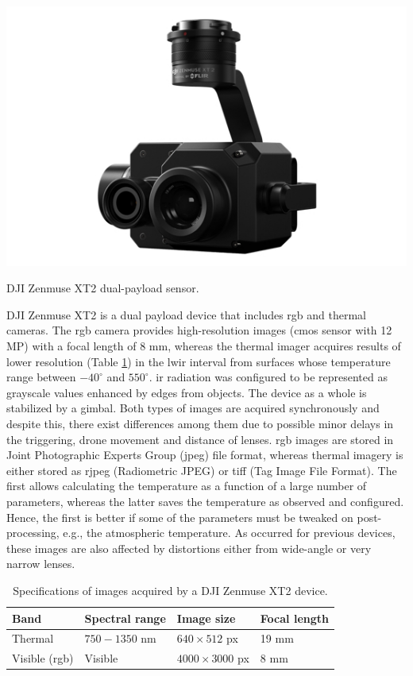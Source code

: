 \begin{marginfigure}[.1cm]
	\includegraphics{figs/materials/zenmuse_xt2.png}
	\caption{DJI Zenmuse XT2 dual-payload sensor.}
	\label{fig:zenmuse_xt2}
\end{marginfigure}
DJI Zenmuse XT2 is a dual payload device that includes \acrshort{rgb} and thermal cameras. The \acrshort{rgb} camera provides high-resolution images (\acrshort{cmos} sensor with 12 MP) with a focal length of 8 \si{\milli\meter}, whereas the thermal imager acquires results of lower resolution (Table \ref{table:zenmuse_xt2}) in the \acrshort{lwir} interval from surfaces whose temperature range between $-40^\circ$ and $550^\circ$. \acrshort{ir} radiation was configured to be represented as grayscale values enhanced by edges from objects. The device as a whole is stabilized by a gimbal. Both types of images are acquired synchronously and despite this, there exist differences among them due to possible minor delays in the triggering, drone movement and distance of lenses. \acrshort{rgb} images are stored in Joint Photographic Experts Group (\acrshort{jpeg}) file format, whereas thermal imagery is either stored as \acrshort{rjpeg} (Radiometric JPEG) or \acrshort{tiff} (Tag Image File Format). The first allows calculating the temperature as a function of a large number of parameters, whereas the latter saves the temperature as observed and configured. Hence, the first is better if some of the parameters must be tweaked on post-processing, e.g., the atmospheric temperature. As occurred for previous devices, these images are also affected by distortions either from wide-angle or very narrow lenses.

\renewcommand{\arraystretch}{1.2}
\begin{table}[ht]
    \caption{Specifications of images acquired by a DJI Zenmuse XT2 device.}
    \label{table:zenmuse_xt2}
    \begin{tabular}{llll}
        \toprule
        Band & Spectral range & Image size & Focal length\\
        \midrule
        Thermal & $750-1350$ \si{\nano\meter} & $640 \times 512$ px & 19 \si{\milli\meter}\\
        Visible (\acrshort{rgb}) & Visible & $4000 \times 3000$ px & 8 \si{\milli\meter}\\
        \bottomrule
    \end{tabular}
\end{table}
\renewcommand{\arraystretch}{1}

